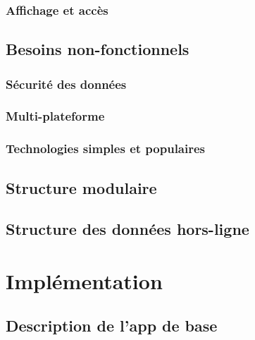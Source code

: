 \documentclass{EPL-master-thesis-covers-FR}
\begin{document}
			\subsection*{Affichage et accès}

			

		\section{Besoins non-fonctionnels}


			\subsection*{Sécurité des données}


			\subsection*{Multi-plateforme}
				

			\subsection*{Technologies simples et populaires}


		\section{Structure modulaire}
			\label{sec:modules}


			

		\section{Structure des données hors-ligne}
			\label{sec:data}


	\chapter{Implémentation}

		\section{Description de l'app de base}
		
\end{document}
